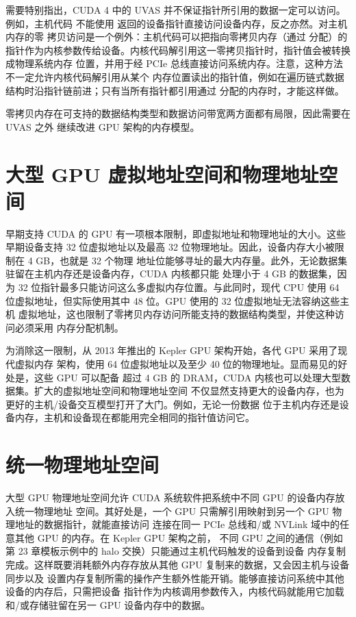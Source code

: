 需要特别指出，CUDA 4 中的 UVAS 并不保证指针所引用的数据一定可以访问。例如，主机代码
不能使用  返回的设备指针直接访问设备内存，反之亦然。对主机内存的零
拷贝访问是一个例外：主机代码可以把指向零拷贝内存（通过  分配）的
指针作为内核参数传给设备。内核代码解引用这一零拷贝指针时，指针值会被转换成物理系统内存
位置，并用于经 PCIe 总线直接访问系统内存。注意，这种方法不一定允许内核代码解引用从某个
内存位置读出的指针值，例如在遍历链式数据结构时沿指针链前进；只有当所有指针都引用通过
 分配的内存时，才能这样做。

零拷贝内存在可支持的数据结构类型和数据访问带宽两方面都有局限，因此需要在 UVAS 之外
继续改进 GPU 架构的内存模型。

\section{大型 GPU 虚拟地址空间和物理地址空间}
\label{sec:appc-large-address-spaces}

早期支持 CUDA 的 GPU 有一项根本限制，即虚拟地址和物理地址的大小。这些早期设备支持 32
位虚拟地址以及最高 32 位物理地址。因此，设备内存大小被限制在 4 GB，也就是 32 个物理
地址位能够寻址的最大内存量。此外，无论数据集驻留在主机内存还是设备内存，CUDA 内核都只能
处理小于 4 GB 的数据集，因为 32 位指针最多只能访问这么多虚拟内存位置。与此同时，现代
CPU 使用 64 位虚拟地址，但实际使用其中 48 位。GPU 使用的 32 位虚拟地址无法容纳这些主机
虚拟地址，这也限制了零拷贝内存访问所能支持的数据结构类型，并使这种访问必须采用
 内存分配机制。

为消除这一限制，从 2013 年推出的 Kepler GPU 架构开始，各代 GPU 采用了现代虚拟内存
架构，使用 64 位虚拟地址以及至少 40 位的物理地址。显而易见的好处是，这些 GPU 可以配备
超过 4 GB 的 DRAM，CUDA 内核也可以处理大型数据集。扩大的虚拟地址空间和物理地址空间
不仅显然支持更大的设备内存，也为更好的主机/设备交互模型打开了大门。例如，无论一份数据
位于主机内存还是设备内存，主机和设备现在都能用完全相同的指针值访问它。

\section{统一物理地址空间}
\label{sec:appc-unified-physical-address-space}

大型 GPU 物理地址空间允许 CUDA 系统软件把系统中不同 GPU 的设备内存放入统一物理地址
空间。其好处是，一个 GPU 只需解引用映射到另一个 GPU 物理地址的数据指针，就能直接访问
连接在同一 PCIe 总线和/或 NVLink 域中的任意其他 GPU 的内存。在 Kepler GPU 架构之前，
不同 GPU 之间的通信（例如第 23 章模板示例中的 halo 交换）只能通过主机代码触发的设备到设备
内存复制完成。这样既要消耗额外内存存放从其他 GPU 复制来的数据，又会因主机与设备同步以及
设置内存复制所需的操作产生额外性能开销。能够直接访问系统中其他设备的内存后，只需把设备
指针作为内核调用参数传入，内核代码就能用它加载和/或存储驻留在另一 GPU 设备内存中的数据。

